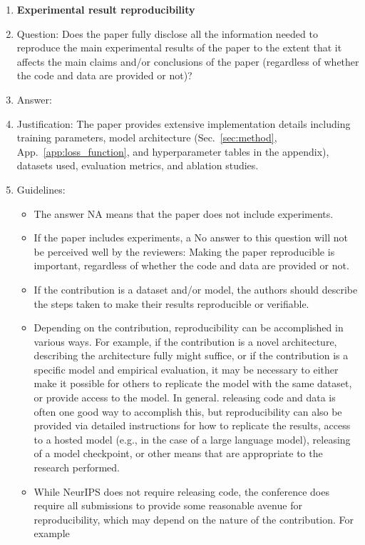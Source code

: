 \documentclass{article}
\theoremstyle{plain}
\theoremstyle{definition}
\theoremstyle{remark}
\begin{document}
{\begin{enumerate}
    \item {\bf Experimental result reproducibility}
    \item[] Question: Does the paper fully disclose all the information needed to reproduce the main experimental results of the paper to the extent that it affects the main claims and/or conclusions of the paper (regardless of whether the code and data are provided or not)?
    \item[] Answer: \answerYes{}
    \item[] Justification: The paper provides extensive implementation details including training parameters, model architecture (Sec.~\ref{sec:method}, App.~\ref{app:loss_function}, and hyperparameter tables in the appendix), datasets used, evaluation metrics, and ablation studies.
    \item[] Guidelines:
    \begin{itemize}
        \item The answer NA means that the paper does not include experiments.
        \item If the paper includes experiments, a No answer to this question will not be perceived well by the reviewers: Making the paper reproducible is important, regardless of whether the code and data are provided or not.
        \item If the contribution is a dataset and/or model, the authors should describe the steps taken to make their results reproducible or verifiable. 
        \item Depending on the contribution, reproducibility can be accomplished in various ways. For example, if the contribution is a novel architecture, describing the architecture fully might suffice, or if the contribution is a specific model and empirical evaluation, it may be necessary to either make it possible for others to replicate the model with the same dataset, or provide access to the model. In general. releasing code and data is often one good way to accomplish this, but reproducibility can also be provided via detailed instructions for how to replicate the results, access to a hosted model (e.g., in the case of a large language model), releasing of a model checkpoint, or other means that are appropriate to the research performed.
        \item While NeurIPS does not require releasing code, the conference does require all submissions to provide some reasonable avenue for reproducibility, which may depend on the nature of the contribution. For example
        \begin{enumerate}

\end{enumerate}
\end{itemize}
\end{enumerate}}
\end{document}
